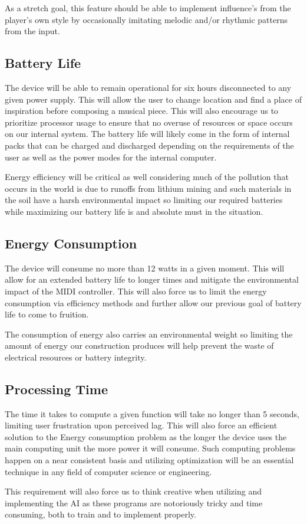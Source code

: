 As a stretch goal, this feature should be able to implement influence's from the player's own style
by occasionally imitating melodic and/or rhythmic patterns from the input.

\subsection{Battery Life}

The device will be able to remain operational for six hours disconnected to any given
power supply. This will allow the user to change location and find a place of inspiration
before composing a musical piece. This will also encourage us to prioritize processor
usage to ensure that no overuse of resources or space occurs on our internal system. The
battery life will likely come in the form of internal packs that can be charged and
discharged depending on the requirements of the user as well as the power modes for the
internal computer.

Energy efficiency will be critical as well considering much of the pollution that occurs
in the world is due to runoffs from lithium mining and such materials in the soil have a
harsh environmental impact so limiting our required batteries while maximizing our battery
life is and absolute must in the situation.

\subsection{Energy Consumption}

The device will consume no more than 12 watts in a given moment. This will allow for an
extended battery life to longer times and mitigate the environmental impact of the MIDI
controller. This will also force us to limit the energy consumption via efficiency methods
and further allow our previous goal of battery life to come to fruition.

The consumption of energy also carries an environmental weight so limiting the amount of
energy our construction produces will help prevent the waste of electrical resources or
battery integrity.

\subsection{Processing Time}

The time it takes to compute a given function will take no longer than 5 seconds, limiting
user frustration upon perceived lag. This will also force an efficient solution to the
Energy consumption problem as the longer the device uses the main computing unit the more
power it will consume. Such computing problems happen on a near consistent basis and
utilizing optimization will be an essential technique in any field of computer science or
engineering.

This requirement will also force us to think creative when utilizing and implementing the
AI as these programs are notoriously tricky and time consuming, both to train and to
implement properly.
